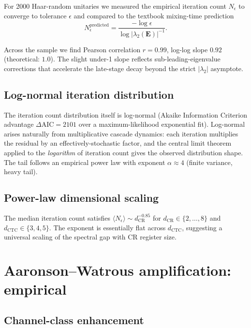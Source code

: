 \documentclass[11pt,a4paper]{article}
\begin{document}
For 2000 Haar-random unitaries we measured the empirical iteration
count $N_\epsilon$ to converge to tolerance $\epsilon$ and compared
to the textbook mixing-time prediction
\begin{equation}
N_\epsilon^{\text{predicted}} = \frac{-\log \epsilon}{\log |\lambda_2(\mathbf{E})|^{-1}}.
\end{equation}

Across the sample we find Pearson correlation $r = 0.99$, log-log
slope $0.92$ (theoretical: $1.0$). The slight under-1 slope reflects
sub-leading-eigenvalue corrections that accelerate the late-stage
decay beyond the strict $|\lambda_2|$ asymptote.

\subsection{Log-normal iteration distribution}

The iteration count distribution itself is log-normal (Akaike
Information Criterion advantage $\Delta \mathrm{AIC} = 2101$ over a
maximum-likelihood exponential fit). Log-normal arises naturally
from multiplicative cascade dynamics: each iteration multiplies the
residual by an effectively-stochastic factor, and the central limit
theorem applied to the \emph{logarithm} of iteration count gives the
observed distribution shape. The tail follows an empirical power
law with exponent $\alpha \approx 4$ (finite variance, heavy tail).

\subsection{Power-law dimensional scaling}

The median iteration count satisfies
$\langle N_\epsilon \rangle \sim d_{\text{CR}}^{-0.85}$ for
$d_{\text{CR}} \in \{2, \ldots, 8\}$ and $d_{\text{CTC}} \in \{3, 4, 5\}$.
The exponent is essentially flat across $d_{\text{CTC}}$, suggesting
a universal scaling of the spectral gap with CR register size.

\section{Aaronson--Watrous amplification: empirical}

\subsection{Channel-class enhancement}
\end{document}
